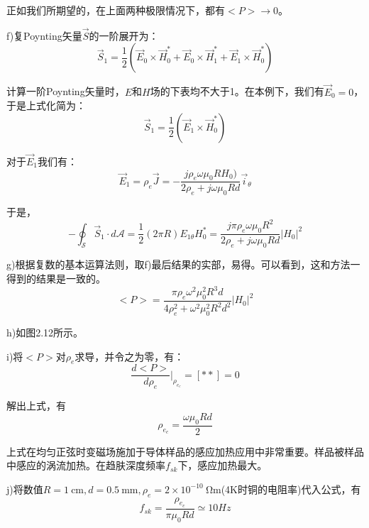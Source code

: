 正如我们所期望的，在上面两种极限情况下，都有$<P>\rightarrow 0$。

f)复Poynting矢量$\vec{S}$的一阶展开为：
\begin{equation*}
\vec{S}_1=\frac{1}{2}(\vec{E}_0 \times \vec{H}_0^*+\vec{E}_0 \times \vec{H}_1^*+\vec{E}_1 \times \vec{H}_0^*) \tag{S7.11}
\end{equation*}

计算一阶Poynting矢量时，$E$和$H$场的下表均不大于1。在本例下，我们有$\vec{E}_0=0$，于是上式化简为：
\begin{equation*}
\vec{S}_1=\frac{1}{2}(\vec{E}_1 \times \vec{H}_0^*) \tag{S7.12}
\end{equation*}

对于$\vec{E}_1$我们有：
\begin{equation*}
\vec{E}_1=\rho_e \vec{J}=-\frac{j\rho_e \omega \mu_0 R H_0)}{2\rho_e+j\omega \mu_0 R d}\vec{i}_\theta \tag{S7.13}
\end{equation*}

于是，
\begin{equation*}
-\oint_{\mathcal{S}}\vec{S}_1 \cdot d\mathcal{A}=\frac{1}{2}(2\pi R)E_{1\theta} H_0^*=\frac{j\pi\rho_e \omega \mu_0 R^2}{2\rho_e+j\omega \mu_0 R d} |H_0|^2 \tag{2.64}
\end{equation*}

g)根据复数的基本运算法则，取f)最后结果的实部，易得。可以看到，这和方法一得到的结果是一致的。
\begin{equation*}
<P>=\frac{\pi \rho_e \omega^2 \mu_0^2 R^3 d}{4\rho_e^2+\omega^2 \mu_0^2 R^2 d^2}|H_0|^2 \tag{S7.14}
\end{equation*}

h)如图2.12所示。

i)将$<P>$对$\rho_e$求导，并令之为零，有：
\begin{equation*}
\frac{d<P>}{d\rho_e} |_{\rho_{e_c}}=[**]=0 \tag{S7.15}
\end{equation*}

解出上式，有
\begin{equation*}
\rho_{e_c}=\frac{\omega \mu_0 R d}{2} \tag{2.65}
\end{equation*}

上式在均匀正弦时变磁场施加于导体样品的感应加热应用中非常重要。样品被样品中感应的涡流加热。在趋肤深度频率$f_{sk}$下，感应加热最大。

j)将数值$R=1\ \mathrm{cm}, d=0.5\ \mathrm{mm},\rho_e=2\times 10^{-10}\ \mathrm{\Omega m}$(4K时铜的电阻率)代入公式，有
\begin{equation*}
f_{sk}=\frac{\rho_{e_c}}{\pi\mu_0 R d}\simeq 10Hz \tag{2.59}
\end{equation*}

